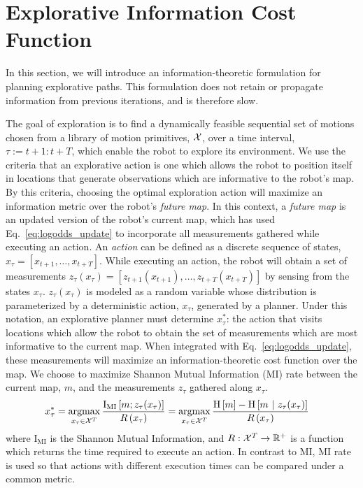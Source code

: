 \section{Explorative Information Cost Function}
\label{section:explorative_information_cost_function}

In this section, we will introduce an information-theoretic formulation for planning explorative paths. This formulation does not retain or propagate information from previous iterations, and is therefore slow.

The goal of exploration is to find a dynamically feasible sequential set of motions chosen from a library of motion primitives, $\mathcal{X}$, over a time interval, $\tau := t+1 : t+T$, which enable the robot to explore its environment. We use the criteria that an explorative action is one which allows the robot to position itself in locations that generate observations which are informative to the robot's map. By this criteria, choosing the optimal exploration action will maximize an information metric over the robot's \textit{future map}. In this context, a \textit{future map} is an updated version of the robot's current map, which has used Eq.~\eqref{eq:logodds_update} to incorporate all measurements gathered while executing an action. An \textit{action} can be defined as a discrete sequence of states, $x_{\tau} = \left[x_{t+1},\dots,x_{t+T}\right]$. While executing an action, the robot will obtain a set of measurements $z_{\tau}(x_{\tau}) = \left[z_{t+1}(x_{t+1}),\dots,z_{t+T}(x_{t+T})\right]$ by sensing from the states $x_{\tau}$. $z_{\tau}(x_{\tau})$ is modeled as a random variable whose distribution is parameterized by a deterministic action, $x_{\tau}$, generated by a planner. Under this notation, an explorative planner must determine $x_{\tau}^{*}$: the action that visits locations which allow the robot to obtain the set of measurements which are most informative to the current map. When integrated with Eq.~\eqref{eq:logodds_update}, these measurements will maximize an information-theoretic cost function over the map. We choose to maximize Shannon Mutual Information (MI) rate between the current map, $m$, and the measurements $z_{\tau}$ gathered along $x_{\tau}$.
%
\begin{align}
  \begin{split}
    x_{\tau}^{*}
    &=
    \argmax_{x_{\tau} \in \mc{X}^{T}}
    \frac{\text{I}_{\text{MI}}
      \left[
        m
        ;
        z_{\tau}(x_{\tau})
      \right]
    }
    {R\left(x_{\tau}\right)}
    =
    \argmax_{x_{\tau} \in \mc{X}^{T}}
    \frac{
      \text{H}
      \left[
        m
      \right]
      -
      \text{H}
      \left[
        m
        \ \vert \
        z_{\tau}(x_{\tau})
      \right]
    }
    {R\left(x_{\tau}\right)}
    \label{eq:mutual_information}
  \end{split}
\end{align}
%
where $\text{I}_{\text{MI}}$ is the Shannon Mutual Information, and $R: \mathcal{X}^{T} \rightarrow {\mathbb{R}}^{+}$ is a function which returns the time required to execute an action. In contrast to MI, MI rate is used so that actions with different execution times can be compared under a common metric.

